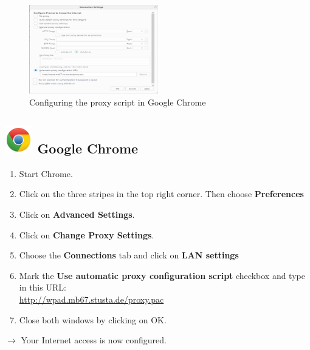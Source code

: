\documentclass[a4paper,12pt]{scrartcl}
\newcommand{\optemph}[1]{\textbf{#1}}
\begin{document}
\newpage
\begin{figure}
  \begin{center}
    \includegraphics[width=0.5\textwidth,keepaspectratio]{Bilder/Proxy_Firefox_EN_mb}
  \end{center}
  \caption{Configuring the proxy script in Google Chrome}
\end{figure}

\subsection*{\includegraphics[height=1.2cm,keepaspectratio]{Bilder/Chrome_2011_logo} Google Chrome}
\begin{enumerate}
    \item Start Chrome.
	\item Click on the three stripes in the top right corner. Then choose \optemph{Preferences}
	\item Click on \optemph{Advanced Settings}.
	\item Click on \optemph{Change Proxy Settings}.
	\item Choose the \optemph{Connections} tab and click on \optemph{LAN settings}
	\item Mark the \optemph{Use automatic proxy configuration script} checkbox and type in this URL: \\ \url{http://wpad.mb67.stusta.de/proxy.pac}
    \item Close both windows by clicking on OK.
\end{enumerate}
$\rightarrow$ Your Internet access is now configured.
\end{document}
